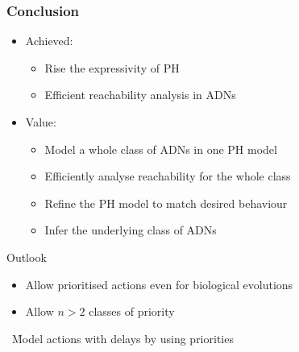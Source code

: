 \begin{frame}[c]
  \frametitle{Conclusion}

\begin{itemize}
  \item Achieved:
  \begin{itemize}
    \item Rise the expressivity of PH
    \item Efficient reachability analysis in ADNs
  \end{itemize}
  
  \smallskip
  \item Value:
  \begin{itemize}
    \item Model a whole class of ADNs in one PH model
    \item Efficiently analyse reachability for the whole class
    \item Refine the PH model to match desired behaviour
    \item Infer the underlying class of ADNs\\\quad\tcite{\citefpimrcmsb}
  \end{itemize}
\end{itemize}



\pause
\bigskip
\begin{flushright}
\Large
\textcolor{couleurtheme}{Outlook}\hspace*{2.7em}
\end{flushright}

\begin{itemize}
  \item Allow prioritised actions even for biological evolutions
  \item Allow $n>2$ classes of priority
\end{itemize}
\qquad~\f Model actions with delays by using priorities
\end{frame}
